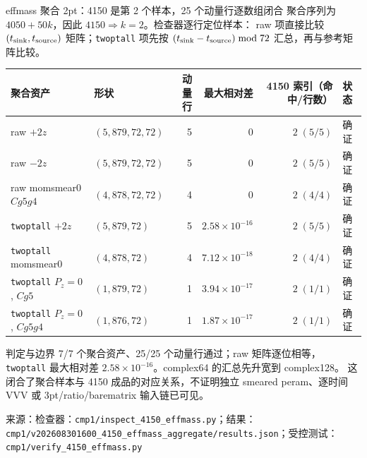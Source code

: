\documentclass[UTF8,aspectratio=169,11pt]{ctexbeamer}
\newcommand{\source}[1]{\vspace{0.05em}\par{\raggedright\scriptsize\color{muted}来源：#1\par}}
\newcommand{\codepath}[1]{\nolinkurl{#1}}
\newcommand{\verified}{\textcolor{evidence}{确证}}
\begin{document}
\begin{frame}[t]{effmass 聚合 2pt：4150 是第 2 个样本，25 个动量行逐数组闭合}
  \footnotesize
  聚合序列为 $4050+50k$，因此 $4150\Rightarrow k=2$。检查器逐行定位样本：
  raw 项直接比较 $(t_{\rm sink},t_{\rm source})$ 矩阵；\codepath{twoptall} 项先按
  $(t_{\rm sink}-t_{\rm source})\bmod72$ 汇总，再与参考矩阵比较。
  \setlength{\tabcolsep}{3pt}
  \renewcommand{\arraystretch}{1.00}
  \begin{tabular}{@{}l l r r r l@{}}
    \toprule
    聚合资产 & 形状 & 动量行 & 最大相对差 & 4150 索引（命中/行数） & 状态\\
    \midrule
    raw $+2z$ & $(5,879,72,72)$ & 5 & $0$ & $2\;(5/5)$ & \verified\\
    raw $-2z$ & $(5,879,72,72)$ & 5 & $0$ & $2\;(5/5)$ & \verified\\
    raw momsmear0 $Cg5g4$ & $(4,878,72,72)$ & 4 & $0$ & $2\;(4/4)$ & \verified\\
    \codepath{twoptall} $+2z$ & $(5,879,72)$ & 5 & $2.58\times10^{-16}$ & $2\;(5/5)$ & \verified\\
    \codepath{twoptall} momsmear0 & $(4,878,72)$ & 4 & $7.12\times10^{-18}$ & $2\;(4/4)$ & \verified\\
    \codepath{twoptall} $P_z=0$, $Cg5$ & $(1,879,72)$ & 1 & $3.94\times10^{-17}$ & $2\;(1/1)$ & \verified\\
    \codepath{twoptall} $P_z=0$, $Cg5g4$ & $(1,876,72)$ & 1 & $1.87\times10^{-17}$ & $2\;(1/1)$ & \verified\\
    \bottomrule
  \end{tabular}
  \vspace{0.06em}
  \begin{block}{判定与边界}
    7/7 个聚合资产、25/25 个动量行通过；raw 矩阵逐位相等，\codepath{twoptall}
    最大相对差 $2.58\times10^{-16}$。complex64 的汇总先升宽到 complex128。
    这闭合了聚合样本与 4150 成品的对应关系，不证明独立 smeared peram、逐时间
    VVV 或 3pt/ratio/barematrix 输入链已可见。
  \end{block}
  \source{检查器：\codepath{cmp1/inspect_4150_effmass.py}；结果：\codepath{cmp1/v202608301600_4150_effmass_aggregate/results.json}；受控测试：\codepath{cmp1/verify_4150_effmass.py}}
\end{frame}
\end{document}

